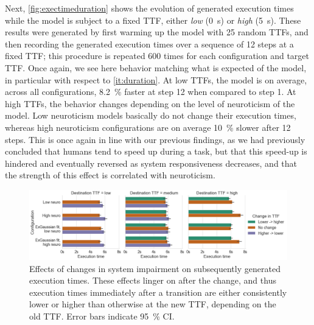 Next, \cref{fig:exectimeduration} shows the evolution of generated execution times while the model is subject to a fixed \ac{TTF}, either \emph{low} (\SI{0}{\second}) or \emph{high} (\SI{5}{\second}).
These results were generated by first warming up the model with \num{25} random \acp{TTF}, and then recording the generated execution times over a sequence of \num{12} steps at a fixed \ac{TTF}; this procedure is repeated \num{600} times for each configuration and target \ac{TTF}.
Once again, we see here behavior matching what is expected of the model, in particular with respect to \cref{it:duration}.
At low \acp{TTF}, the model is on average, across all configurations, \SI{8.2}{\percent} faster at step \num{12} when compared to step \num{1}.
At high \acp{TTF}, the behavior changes depending on the level of neuroticism of the model.
Low neuroticism models basically do not change their execution times, whereas high neuroticism configurations are on average \SI{10}{\percent} slower after \num{12} steps.
This is once again in line with our previous findings, as we had previously concluded that humans tend to speed up during a task, but that this speed-up is hindered and eventually reversed as system responsiveness decreases, and that the strength of this effect is correlated with neuroticism.

\begin{figure}
    \centering
    \includegraphics[width=\textwidth]{figs/new_model/transitions.png}
    \caption{%
        Effects of changes in system impairment on subsequently generated execution times.
        These effects linger on after the change, and thus execution times immediately after a transition are either consistently lower or higher than otherwise at the new \ac{TTF}, depending on the old \ac{TTF}.
        Error bars indicate \SI{95}{\percent} \ac{CI}.
    }\label{fig:transitions}
\end{figure}

